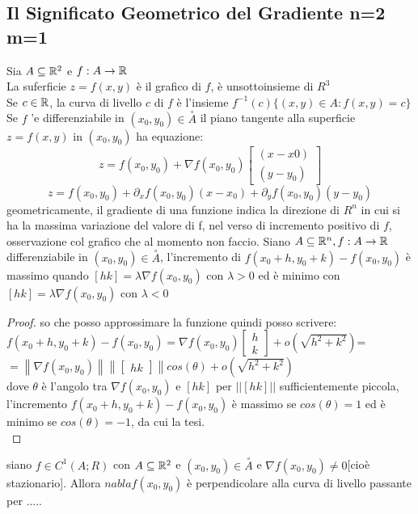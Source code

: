 \subsection{Il Significato Geometrico del Gradiente n=2 m=1}
Sia $A\subseteq \mathbb{R}^2$ e $f:A\rightarrow \mathbb{R}$\\
La suferficie $z=f(x,y)$ è il grafico di $f$, è unsottoinsieme di $R^3$\\
Se $c\in \mathbb{R}$, la curva di livello $c$ di $f$ è l'insieme $f^{-1}(c)\{(x,y)\in A: f(x,y)=c\}$\\
Se $f$ 	'e differenziabile in $(x_0,y_0)\in\overset{\circ}{A}$ il piano tangente alla superficie $z=f(x,y)$ in $(x_0,y_0)$ ha equazione:\\
$$z=f(x_0,y_0)+\nabla f(x_0,y_0)\begin{bmatrix}(x-x0)\\(y-y_0)\end{bmatrix}$$ 
$$z=f(x_0,y_0)+\partial_xf(x_0,y_0)(x-x_0)+\partial_yf(x_0,y_0)(y-y_0)$$
\observation
geometricamente, il gradiente di una funzione indica la direzione di $R^n$ in cui si ha la massima variazione del valore di f, nel verso di incremento positivo di $f$,
\observation 
osservazione col grafico che al momento non faccio.
\proposition
Siano $A\subseteq \mathbb{R}^n, f:A\rightarrow \mathbb{R}$ differenziabile in $(x_0,y_0)\in \overset{\circ}{A}$, l'incremento di $f(x_0+h,y_0+k)-f(x_0,y_0)$ è massimo quando $[h k]=\lambda\nabla f(x_0,y_0)$ con $\lambda >0$ ed è minimo con $[h k]=\lambda\nabla f(x_0,y_0)$ con $\lambda <0$
\begin{proof}
	so che posso approssimare la funzione quindi posso scrivere:\\
	$f(x_0+h,y_0+k)-f(x_0,y_0)=\nabla f(x_0,y_0)\begin{bmatrix}h\\k\end{bmatrix}+o(\sqrt{h^2+k^2})$=
	$=\left\| \nabla f(x_0,y_0) \right\|\left\|\begin{bmatrix}h k\end{bmatrix}\right\|cos(\theta)+o(\sqrt{h^2+k^2})$\\
	dove $\theta$ è l'angolo tra $\nabla f(x_0,y_0)$ e $[h k]$ per $||[h k]||$ sufficientemente piccola, l'incremento $f(x_0+h,y_0+k)-f(x_0,y_0)$ è massimo se $cos( \theta )=1$ ed è minimo se $cos(\theta )=-1$, da cui la tesi.\\ 
\end{proof}
\proposition
siano $f\in C^1(A;R)$ con $A\subseteq \mathbb{R}^2$ e $(x_0,y_0)\in\overset{\circ}{A}$ e $\nabla f(x_0,y_0)\ne 0$[cioè stazionario]. Allora $nabla f(x_0,y_0)$ è perpendicolare alla curva di livello passante per .....
